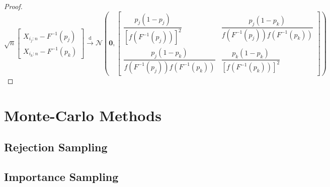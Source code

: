 \documentclass[11pt]{report} %
\begin{document}
\begin{proof}
\begin{equation}
\sqrt{n}\begin{bmatrix}
X_{i_{j}:n} - F^{-1}\left(p_{j}\right) \\
X_{i_{k}:n} - F^{-1}\left(p_{k}\right)
\end{bmatrix} \overset{\mathrm{d}}{\to} \mathcal{N}\left(\mathbf{0}, \begin{bmatrix}
\dfrac{p_{j}\left(1 - p_{j}\right)}{\left[f\left(F^{-1}\left(p_{j}\right)\right)\right]^{2}} & \dfrac{p_{j}\left(1 - p_{k}\right)}{f\left(F^{-1}\left(p_{j}\right)\right)f\left(F^{-1}\left(p_{k}\right)\right)} \\ \dfrac{p_{j}\left(1 - p_{k}\right)}{f\left(F^{-1}\left(p_{j}\right)\right)f\left(F^{-1}\left(p_{k}\right)\right)} & \dfrac{p_{k}\left(1 - p_{k}\right)}{\left[f\left(F^{-1}\left(p_{k}\right)\right)\right]^{2}} 
\end{bmatrix}\right)
\end{equation}

\end{proof}


\section{Monte-Carlo Methods}

\subsection{Rejection Sampling}

\subsection{Importance Sampling}
\end{document}

